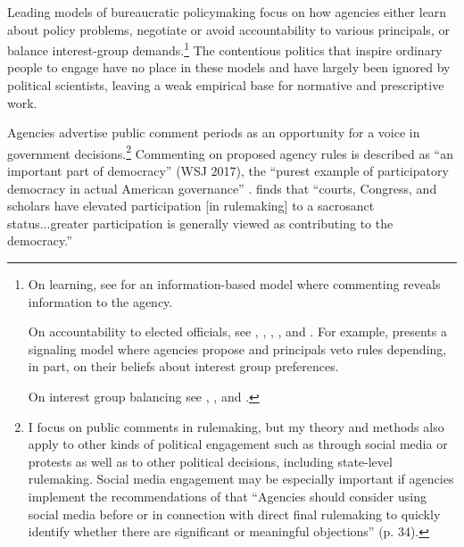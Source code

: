 Leading models of bureaucratic policymaking focus on how agencies either learn about policy problems, negotiate or avoid accountability to various principals, or balance interest-group demands.\footnote{
On learning, see \citet{Libgober2018} for an information-based model where commenting reveals information to the agency. 

On accountability to elected officials, see  \citet{Furlong1997}, \citet{Nou2016}, \citet{Potter2016}, \citet{Woods2018}, and \citet{Yackee2009RegGov}. For example, \citet{Potter2014dis} presents a signaling model where agencies propose and principals veto rules depending, in part, on their beliefs about interest group preferences. 

On interest group balancing see \citet{Yackee2006JOP},  \citet{Yackee2006JPART}, and \citet{Kerwin2011}.
} 
The contentious politics that inspire ordinary people to engage have no place in these models and have largely been ignored by political scientists, leaving a weak empirical base for normative and prescriptive work.

Agencies advertise public comment periods as an opportunity for a voice in government decisions.\footnote{
I focus on public comments in rulemaking, but my theory and methods also apply to other kinds of political engagement such as through social media or protests as well as to other political decisions, including state-level rulemaking. Social media engagement may be especially important if agencies implement the recommendations of \citet{ACUS2018} that ``Agencies should consider using social media before or in connection with direct final rulemaking to quickly identify whether there are significant or meaningful objections'' (p. 34). 
} 
Commenting on proposed agency rules is described as ``an important part of democracy'' (WSJ 2017), the ``purest example of participatory democracy in actual American governance'' \citep{Herz2016}. \citet{Rossi1997} finds that ``courts, Congress, and scholars have elevated participation [in rulemaking] to a sacrosanct status...greater participation is generally viewed as contributing to the democracy.'' %

